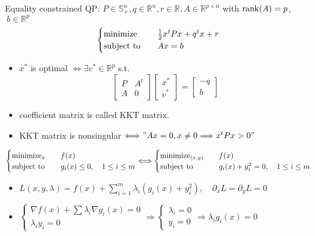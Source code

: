 \begin{remark}
    Equality constrained QP: $P \in \mathbb{S}_+^n, q \in \mathbb{R}^n, r \in \mathbb{R}, A \in \mathbb{R}^{p \times n}$ with $\rank(A) = p$,$\ b \in \mathbb{R}^p$ \[\begin{cases}
        \operatorname{minimize} \quad & \frac{1}{2}x^tPx + q^tx + r \\
        \operatorname{subject\ to} \quad & Ax = b
    \end{cases}\]
    \begin{itemize}
        \item $x^*$ is optimal $\Longleftrightarrow \exists v^* \in \mathbb{R}^p$ s.t.\[\begin{bmatrix}
            P & A^t \\
            A & 0
        \end{bmatrix} \begin{bmatrix}
            x^* \\ v^*
        \end{bmatrix} = \begin{bmatrix}
            -q \\ b
        \end{bmatrix}\]
        \item coefficient matrix is called KKT matrix.
        \item KKT matrix is nonsingular $\Longleftrightarrow "Ax = 0, x \neq 0 \Longrightarrow x^tPx > 0"$
    \end{itemize}
\end{remark}

\begin{remark}
    \[\begin{cases}
        \operatorname{minimize}_x \quad &f(x)\\
        \operatorname{subject\ to} \quad &g_i(x) \le 0, \quad 1 \le i \le m
    \end{cases} \Longleftrightarrow \begin{cases}
        \operatorname{minimize}_{(x, y)} \quad &f(x)\\
        \operatorname{subject\ to} \quad &g_i(x) + y_i^2 = 0, \quad 1 \le i \le m
    \end{cases}\]
    \begin{itemize}
        \item $L(x, y, \lambda) = f(x) + \sum_{i = 1}^m \lambda_i(g_i(x) + y_i^2), \quad \partial_xL = \partial_yL = 0$
        \item $\begin{cases}
            \nabla f(x) + \sum \lambda_i\nabla g_i(x) = 0\\
            \lambda_iy_i = 0
        \end{cases} \Longrightarrow \begin{cases}
            \lambda_i = 0\\
            y_i = 0
        \end{cases} \Longrightarrow \lambda_ig_i(x) = 0$
    \end{itemize}
\end{remark}

